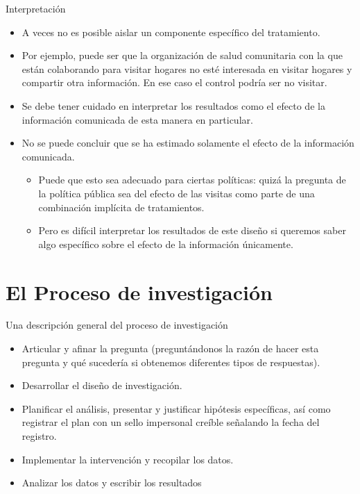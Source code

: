 \documentclass[
  ignorenonframetext,
]{beamer}
\begin{document}
\begin{frame}{Interpretación}
\protect\hypertarget{interpretaciuxf3n}{}
\begin{itemize}
\item
  A veces no es posible aislar un componente específico del tratamiento.
\item
  Por ejemplo, puede ser que la organización de salud comunitaria con la
  que están colaborando para visitar hogares no esté interesada en
  visitar hogares y compartir otra información. En ese caso el control
  podría ser no visitar.
\item
  Se debe tener cuidado en interpretar los resultados como el efecto de
  la información comunicada de esta manera en particular.
\item
  No se puede concluir que se ha estimado solamente el efecto de la
  información comunicada.

  \begin{itemize}
  \item
    Puede que esto sea adecuado para ciertas políticas: quizá la
    pregunta de la política pública sea del efecto de las visitas como
    parte de una combinación implícita de tratamientos.
  \item
    Pero es difícil interpretar los resultados de este diseño si
    queremos saber algo específico sobre el efecto de la información
    únicamente.
  \end{itemize}
\end{itemize}
\end{frame}

\hypertarget{el-proceso-de-investigaciuxf3n}{%
\section{El Proceso de
investigación}\label{el-proceso-de-investigaciuxf3n}}

\begin{frame}{Una descripción general del proceso de investigación}
\protect\hypertarget{una-descripciuxf3n-general-del-proceso-de-investigaciuxf3n}{}
\begin{itemize}
\item
  Articular y afinar la pregunta (preguntándonos la razón de hacer esta
  pregunta y qué sucedería si obtenemos diferentes tipos de respuestas).
\item
  Desarrollar el diseño de investigación.
\item
  Planificar el análisis, presentar y justificar hipótesis específicas,
  así como registrar el plan con un sello impersonal creíble señalando
  la fecha del registro.
\item
  Implementar la intervención y recopilar los datos.
\item
  Analizar los datos y escribir los resultados
\end{itemize}
\end{frame}
\end{document}
